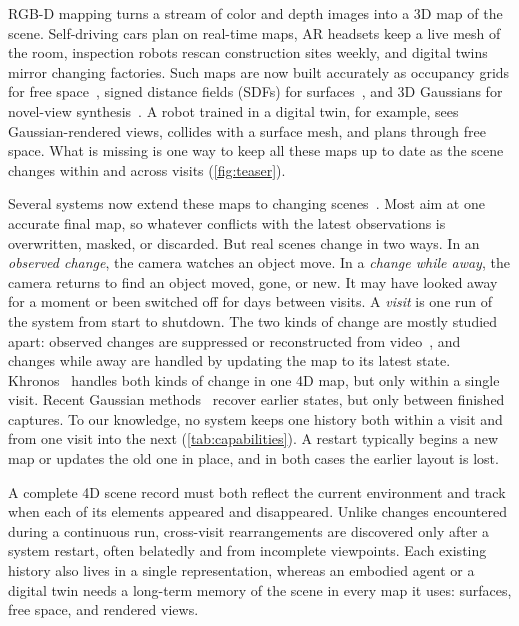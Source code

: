 \documentclass[10pt,twocolumn,letterpaper]{article}
\begin{document}
RGB-D mapping turns a stream of color and depth images into a 3D map of
the scene. Self-driving cars plan on real-time maps, AR headsets keep a live
mesh of the room, inspection robots rescan construction sites weekly, and
digital twins mirror changing factories. Such maps are now built accurately as
occupancy grids for free
space~\cite{10.1007/s10514-012-9321-0,Reijgwart-RSS-23}, signed distance
fields (SDFs) for surfaces~\cite{6162880,8202315}, and 3D Gaussians for
novel-view synthesis~\cite{Keetha_2024_CVPR,Matsuki_2024_CVPR}. A robot trained in a digital twin, for example, sees Gaussian-rendered views, collides
with a surface mesh, and plans through free space. What is missing is one way to keep all these maps up to date as the scene changes
within and across visits (\cref{fig:teaser}).

Several systems now extend these maps to changing
scenes~\cite{Zheng_2025_CVPR,Reijgwart-RSS-23,Yugay_2026_CVPR}. Most aim at one
accurate final map, so whatever conflicts with the latest observations is
overwritten, masked, or discarded. But real scenes change in two ways. In an \emph{observed change}, the camera
watches an object move. In a \emph{change while away}, the camera returns to
find an object moved, gone, or new. It may have looked away for a moment or
been switched off for days between visits. A \emph{visit} is one run of the system from start to shutdown.
The two kinds of change are mostly studied apart: observed changes are suppressed or
reconstructed from
video~\cite{Wu_2024_CVPR_4dgs,Li_2024_CVPR_spacetime,Matsuki_2025_CVPR}, and
changes while away are handled by updating the map to its latest state. Khronos~\cite{Schmid-RSS-24} handles both kinds of change in one 4D map, but only within a single visit. Recent Gaussian methods~\cite{Ackermann_2025_ICCV,Zeng_2025_ICCV} recover earlier states, but only between finished captures. To our
knowledge, no system keeps one history both within a visit and from one visit into the next
(\cref{tab:capabilities}). A restart typically begins a new map or
updates the old one in place, and in both cases the earlier layout is lost.

A complete 4D scene record must both reflect the current environment and track
when each of its elements appeared and disappeared. Unlike changes encountered during a continuous run, cross-visit rearrangements are discovered only after a system restart, often belatedly and from incomplete viewpoints. Each existing history also lives in a single representation, whereas an
embodied agent or a digital twin needs a long-term memory of the scene in every
map it uses: surfaces, free space, and rendered views.
\end{document}
